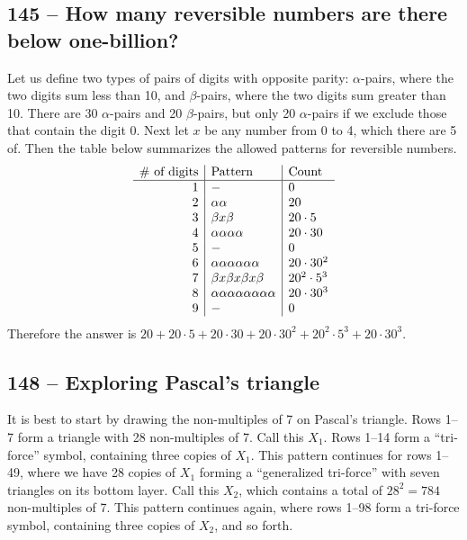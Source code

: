 \documentclass{article}
\begin{document}
\subsection*{145 -- How many reversible numbers are there below one-billion?}
Let us define two types of pairs of digits with opposite parity: $\alpha$-pairs, where the two digits sum less than 10, and $\beta$-pairs, where the two digits sum greater than 10.
There are 30 $\alpha$-pairs and 20 $\beta$-pairs, but only 20 $\alpha$-pairs if we exclude those that contain the digit 0.
Next let $x$ be any number from 0 to 4, which there are 5 of.
Then the table below summarizes the allowed patterns for reversible numbers.
\begin{align*}
	\begin{array}{r | l | l}
	\text{\# of digits} & \text{Pattern} & \text{Count} \\ \hline
	1 & - & 0 \\
	2 & \alpha\alpha & 20 \\
	3 & \beta x \beta & 20\cdot 5 \\
	4 & \alpha\alpha\alpha\alpha & 20 \cdot 30 \\
	5 & - & 0 \\
	6 & \alpha\alpha\alpha\alpha\alpha\alpha & 20 \cdot 30^2 \\
	7 & \beta x \beta x \beta x \beta & 20^2 \cdot 5^3 \\
	8 & \alpha\alpha\alpha\alpha\alpha\alpha\alpha\alpha & 20 \cdot 30^3 \\
	9 & - & 0 \end{array}
\end{align*}
Therefore the answer is $\boxed{20 + 20\cdot 5 + 20 \cdot 30 + 20 \cdot 30^2 + 20^2 \cdot 5^3 + 20 \cdot 30^3}$.


\subsection*{148 -- Exploring Pascal's triangle}
It is best to start by drawing the non-multiples of 7 on Pascal's triangle.
Rows 1--7 form a triangle with 28 non-multiples of 7.
Call this $X_1$.
Rows 1--14 form a ``tri-force'' symbol, containing three copies of $X_1$.
This pattern continues for rows 1--49, where we have 28 copies of $X_1$ forming a ``generalized tri-force'' with seven triangles on its bottom layer.
Call this $X_2$, which contains a total of $28^2 = 784$ non-multiples of 7.
This pattern continues again, where rows 1--98 form a tri-force symbol, containing three copies of $X_2$, and so forth. \\
\end{document}

